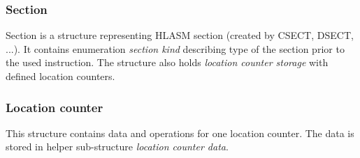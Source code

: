 \subsubsection{Section}

Section is a structure representing HLASM section (created by CSECT, DSECT, ...). It contains enumeration \emph{section kind} describing type of the section prior to the used instruction. The structure also holds \emph{location counter storage} with defined location counters.

\subsubsection{Location counter}

This structure contains data and operations for one location counter. The data is stored in helper sub-structure \emph{location counter data}.

